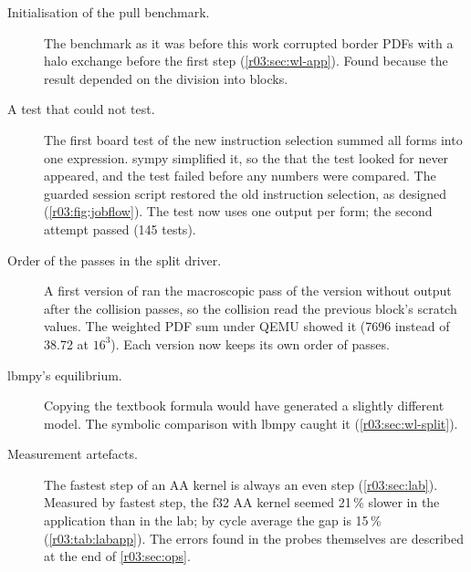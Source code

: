 \begin{description}
  \item[Initialisation of the pull benchmark.] The benchmark as it was before this work
        corrupted border PDFs with a halo exchange before the first step
        (\cref{r03:sec:wl-app}). Found because the result depended on the division into blocks.
  \item[A test that could not test.] The first board test of the new instruction selection
        summed all forms into one expression. sympy simplified it, so the  that
        the test looked for never appeared, and the test failed before any numbers were
        compared. The guarded session script restored the old instruction selection, as designed
        (\cref{r03:fig:jobflow}). The test now uses one output per form; the second attempt
        passed (145 tests).
  \item[Order of the passes in the split driver.] A first version of  ran
        the macroscopic pass of the version without output after the collision passes, so the
        collision read the previous block's scratch values. The weighted PDF sum under QEMU
        showed it (7696 instead of 38.72 at $16^3$). Each version now keeps its own order of
        passes.
  \item[lbmpy's equilibrium.] Copying the textbook formula would have generated a slightly
        different model. The symbolic comparison with lbmpy caught it (\cref{r03:sec:wl-split}).
  \item[Measurement artefacts.] The fastest step of an AA kernel is always an even step
        (\cref{r03:sec:lab}). Measured by fastest step, the f32 AA kernel seemed 21\,\% slower in
        the application than in the lab; by cycle average the gap is 15\,\%
        (\cref{r03:tab:labapp}). The errors found in the probes themselves are described at the end of \cref{r03:sec:ops}.
\end{description}
